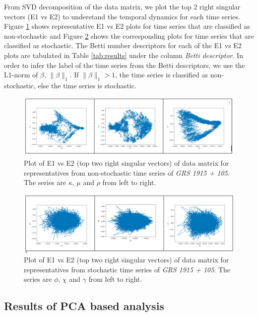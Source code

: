\documentclass[10pt,conference]{IEEEtran}
\begin{document}
From SVD decomposition of the data matrix, we plot the top 2 right singular vectors (E1 vs E2) to understand the temporal dynamics for each time series. Figure \ref{svd_e1e2_nonstochastic} shows representative E1 vs E2 plots for time series  that are classified as non-stochastic and Figure \ref{svd_e1e2_stochastic}  shows the corresponding plots for time series that are classified as stochastic. The Betti number descriptors for each of the E1 vs E2 plots are tabulated in Table \ref{tab:results} under the column \textit{Betti descriptor}. In order to infer the label of the time series from the Betti descriptors, we use the L1-norm of $\beta$, $\|\beta\|_1$. If $\|\beta\|_1 > 1$, the time series is classified as non-stochastic, else the time series is stochastic.

\begin{figure}[ht]
 \centering
 \includegraphics[width=\linewidth]{svd_non_stochastic.png}
 \caption{Plot of E1 vs E2 (top two right singular vectors) of data matrix for  representatives from non-stochastic time series of \textit{GRS 1915 + 105}. The series are $\kappa$, $\mu$ and $\rho$ from left to right.}
 \label{svd_e1e2_nonstochastic}
\end{figure}

\begin{figure}[ht]
 \centering
 \includegraphics[width=\linewidth]{svd_stochastic.png}
 \caption{Plot of E1 vs E2 (top two right singular vectors) of data matrix for  representatives from  stochastic time series  of \textit{GRS 1915 + 105}. The series are $\phi$, $\chi$ and $\gamma$ from left to right.}
 \label{svd_e1e2_stochastic}
\end{figure}


\subsection{Results of PCA based analysis}
\end{document}
